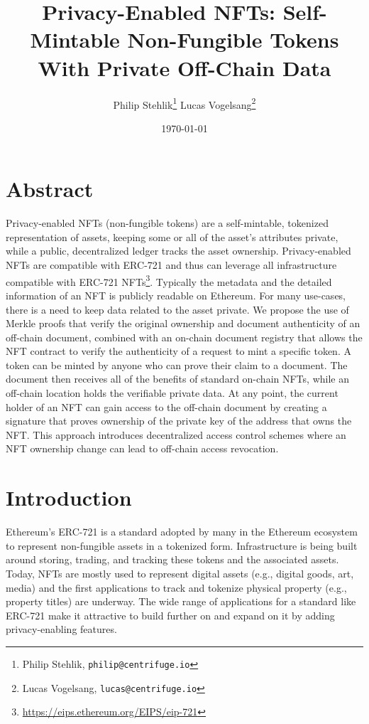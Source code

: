 \documentclass[a4paper, 10pt]{article}
\title{\LARGE \bf
Privacy-Enabled NFTs: Self-Mintable Non-Fungible Tokens With Private Off-Chain Data
}
\date{\today}
\author{Philip Stehlik\thanks{Philip Stehlik, {\tt\small philip@centrifuge.io}}  \hspace{0.1cm} Lucas Vogelsang\thanks{Lucas Vogelsang, {\tt\small lucas@centrifuge.io}} }
\begin{document}
\maketitle
\thispagestyle{empty}
\pagestyle{empty}

\section{Abstract}
Privacy-enabled NFTs (non-fungible tokens) are a self-mintable, tokenized representation of assets, keeping some or all of the asset’s attributes private, while a public, decentralized ledger tracks the asset ownership. Privacy-enabled NFTs are compatible with ERC-721 and thus can leverage all infrastructure compatible with ERC-721 NFTs\footnote{\url{https://eips.ethereum.org/EIPS/eip-721}}. Typically the metadata and the detailed information of an NFT is publicly readable on Ethereum. For many use-cases, there is a need to keep data related to the asset private. We propose the use of Merkle proofs that verify the original ownership and document authenticity of an off-chain document, combined with an on-chain document registry that allows the NFT contract to verify the authenticity of a request to mint a specific token. A token can be minted by anyone who can prove their claim to a document. The document then receives all of the benefits of standard on-chain NFTs, while an off-chain location holds the verifiable private data. At any point, the current holder of an NFT can gain access to the off-chain document by creating a signature that proves ownership of the private key of the address that owns the NFT. This approach introduces decentralized access control schemes where an NFT ownership change can lead to off-chain access revocation.

\section{Introduction}
Ethereum's ERC-721 is a standard adopted by many in the Ethereum ecosystem to represent non-fungible assets in a tokenized form. Infrastructure is being built around storing, trading, and tracking these tokens and the associated assets. Today, NFTs are mostly used to represent digital assets (e.g., digital goods, art, media) and the first applications to track and tokenize physical property (e.g., property titles) are underway. The wide range of applications for a standard like ERC-721 make it attractive to build further on and expand on it by adding privacy-enabling features.
\end{document}
